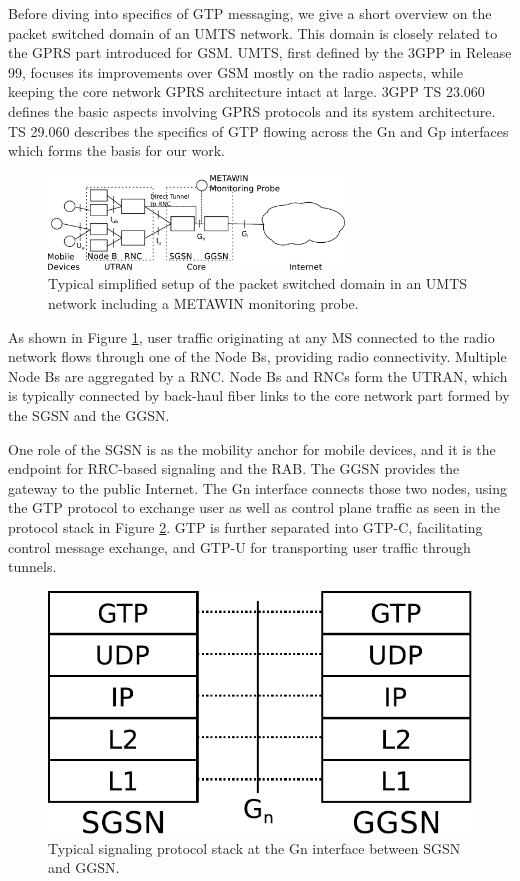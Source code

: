 Before diving into specifics of \ac{GTP} messaging, we give a short overview on the packet switched domain of an \ac{UMTS} network. This domain is closely related to the \ac{GPRS} part introduced for \acs{GSM}. \ac{UMTS}, first defined by the \ac{3GPP} in Release 99, focuses its improvements over \ac{GSM} mostly on the radio aspects, while keeping the core network \ac{GPRS} architecture intact at large. \ac{3GPP} \ac{TS} 23.060 \cite{3gpp23060} defines the basic aspects involving \ac{GPRS} protocols and its system architecture. \ac{TS} 29.060 \cite{3gpp29060} describes the specifics of \ac{GTP} flowing across the Gn and Gp interfaces which forms the basis for our work.


\begin{figure}
	\centering
	\includegraphics[width=0.7\textwidth]{images/CONEXT2012/umts-network.pdf}
	\caption{Typical simplified setup of the packet switched domain in an \acs{UMTS} network including a METAWIN monitoring probe.}
	\label{fig:umtsnetwork-CONEXT}
\end{figure}



As shown in Figure \ref{fig:umtsnetwork-CONEXT}, user traffic originating at any \ac{MS} connected to the radio network flows through one of the Node Bs, providing radio connectivity. Multiple Node Bs are aggregated by a \ac{RNC}. Node Bs and \acp{RNC} form the \ac{UTRAN}, which is typically connected by back-haul fiber links to the core network part formed by the \ac{SGSN} and the \ac{GGSN}.

One role of the \ac{SGSN} is as the mobility anchor for mobile devices, and it is the endpoint for \ac{RRC}-based signaling and the \ac{RAB}. The \ac{GGSN} provides the gateway to the public Internet. The Gn interface connects those two nodes, using the \ac{GTP} protocol to exchange user as well as control plane traffic as seen in the protocol stack in Figure \ref{fig:signallingstack-CONEXT}. \ac{GTP} is further separated into GTP-C, facilitating control message exchange, and GTP-U for transporting user traffic through tunnels.


\begin{figure}
	\centering
	\includegraphics[width=0.6\columnwidth]{images/CONEXT2012/signalling-stack.pdf}
	\caption{Typical signaling protocol stack at the Gn interface between \ac{SGSN} and \ac{GGSN}.}
	\label{fig:signallingstack-CONEXT}
\end{figure}




